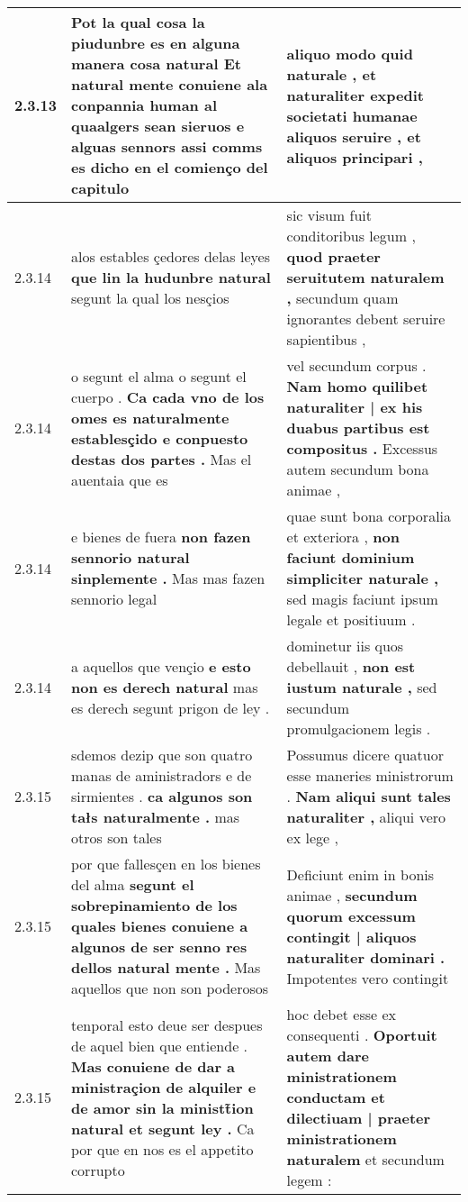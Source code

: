 \begin{tabular}{|p{1cm}|p{6.5cm}|p{6.5cm}|}
2.3.13 & Pot la qual cosa la piudunbre es en alguna manera cosa natural \textbf{ Et natural mente conuiene ala conpannia human } al quaalgers sean sieruos e alguas sennors assi comms es dicho en el comienço del capitulo & aliquo modo quid naturale , \textbf{ et naturaliter expedit societati humanae aliquos seruire , } et aliquos principari , \\\hline
2.3.14 & alos estables çedores delas leyes \textbf{ que lin la hudunbre natural } segunt la qual los nesçios & sic visum fuit conditoribus legum , \textbf{ quod praeter seruitutem naturalem , } secundum quam ignorantes debent seruire sapientibus , \\\hline
2.3.14 & o segunt el alma o segunt el cuerpo . \textbf{ Ca cada vno de los omes es naturalmente establesçido e conpuesto destas dos partes . } Mas el auentaia que es & vel secundum corpus . \textbf{ Nam homo quilibet naturaliter | ex his duabus partibus est compositus . } Excessus autem secundum bona animae , \\\hline
2.3.14 & e bienes de fuera \textbf{ non fazen sennorio natural sinplemente . } Mas mas fazen sennorio legal & quae sunt bona corporalia et exteriora , \textbf{ non faciunt dominium simpliciter naturale , } sed magis faciunt ipsum legale et positiuum . \\\hline
2.3.14 & a aquellos que vençio \textbf{ e esto non es derech natural } mas es derech segunt prigon de ley . & dominetur iis quos debellauit , \textbf{ non est iustum naturale , } sed secundum promulgacionem legis . \\\hline
2.3.15 & sdemos dezip que son quatro manas de aministradors e de sirmientes . \textbf{ ca algunos son tałs naturalmente . } mas otros son tales & Possumus dicere quatuor esse maneries ministrorum . \textbf{ Nam aliqui sunt tales naturaliter , } aliqui vero ex lege , \\\hline
2.3.15 & por que fallesçen en los bienes del alma \textbf{ segunt el sobrepinamiento de los quales bienes conuiene a algunos de ser senno res dellos natural mente . } Mas aquellos que non son poderosos & Deficiunt enim in bonis animae , \textbf{ secundum quorum excessum contingit | aliquos naturaliter dominari . } Impotentes vero contingit \\\hline
2.3.15 & tenporal esto deue ser despues de aquel bien que entiende . \textbf{ Mas conuiene de dar a ministraçion de alquiler e de amor sin la ministt̃ion natural et segunt ley . } Ca por que en nos es el appetito corrupto & hoc debet esse ex consequenti . \textbf{ Oportuit autem dare ministrationem conductam et dilectiuam | praeter ministrationem naturalem } et secundum legem : \\\hline

\end{tabular}
